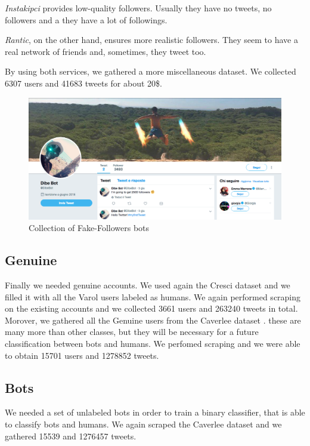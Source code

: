 \emph{Instakipci} provides low-quality followers. Usually they have no tweets, no followers and a they have a lot of followings.

\emph{Rantic}, on the other hand, ensures more realistic followers. They seem to have a real network of friends and, sometimes, they tweet too.

By using both services, we gathered a more miscellaneous dataset.
We collected 6307 users and 41683 tweets for about 20\$.
\begin{figure}
	\centering
	\includegraphics[width=\columnwidth]{chapter3/figure/dibebot.png}
	\caption{Collection of Fake-Followers bots}
	\label{fig:dibebot}
\end{figure}

\subsection{Genuine}
Finally we needed genuine accounts. We used again the Cresci dataset \cite{Cresci} and we filled it with all the Varol users labeled as humans. We again performed scraping on the existing accounts and we collected 3661 users and 263240 tweets in total.
Morover, we gathered all the Genuine users from the Caverlee dataset \cite{Lee11sevenmonths}. these are many more than other classes, but they will be necessary for a future classification between bots and humans. We perfomed scraping and we were able to obtain 15701 users and 1278852 tweets.

\subsection{Bots}
We needed a set of unlabeled bots in order to train a binary classifier, that is able to classify bots and humans. We again scraped the Caverlee dataset \cite{Lee11sevenmonths} and we gathered 15539 and 1276457 tweets.

